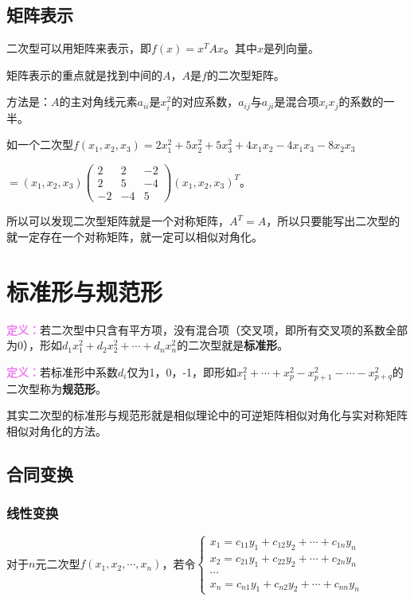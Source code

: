 \documentclass[UTF8, 12pt]{ctexart}
\begin{document}
\subsection{矩阵表示}

二次型可以用矩阵来表示，即$f(x)=x^TAx$。其中$x$是列向量。

矩阵表示的重点就是找到中间的$A$，$A$是$f$的二次型矩阵。

方法是：$A$的主对角线元素$a_{ii}$是$x_i^2$的对应系数，$a_{ij}$与$a_{ji}$是混合项$x_ix_j$的系数的一半。

如一个二次型$f(x_1,x_2,x_3)=2x_1^2+5x_2^2+5x_3^2+4x_1x_2-4x_1x_3-8x_2x_3$

$=(x_1,x_2,x_3)\left(\begin{array}{ccc}
2 & 2 & -2 \\
2 & 5 & -4 \\
-2 & -4 & 5
\end{array}\right)(x_1,x_2,x_3)^T$。

所以可以发现二次型矩阵就是一个对称矩阵，$A^T=A$，所以只要能写出二次型的就一定存在一个对称矩阵，就一定可以相似对角化。

\section{标准形与规范形}

\textcolor{violet}{\textbf{定义：}}若二次型中只含有平方项，没有混合项（交叉项，即所有交叉项的系数全部为0），形如$d_1x_1^2+d_2x_2^2+\cdots+d_nx_n^2$的二次型就是\textbf{标准形}。

\textcolor{violet}{\textbf{定义：}}若标准形中系数$d_i$仅为1，0，-1，即形如$x_1^2+\cdots+x_p^2-x_{p+1}^2-\cdots-x_{p+q}^2$的二次型称为\textbf{规范形}。

其实二次型的标准形与规范形就是相似理论中的可逆矩阵相似对角化与实对称矩阵相似对角化的方法。

\subsection{合同变换}

\subsubsection{线性变换}

对于$n$元二次型$f(x_1,x_2,\cdots,x_n)$，若令$\left\{\begin{array}{l}
x_1=c_{11}y_1+c_{12}y_2+\cdots+c_{1n}y_n \\
x_2=c_{21}y_1+c_{22}y_2+\cdots+c_{2n}y_n \\
\cdots \\
x_n=c_{n1}y_1+c_{n2}y_2+\cdots+c_{nn}y_n
\end{array}\right.$
\end{document}

